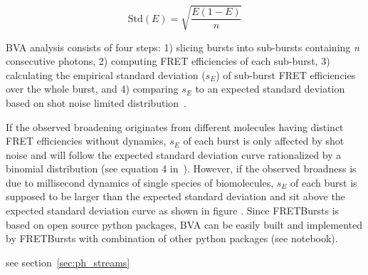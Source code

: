 \begin{equation}
\label{eq:binom_std}
\operatorname{Std(\textit{E})} = {\sqrt{\frac{E(1 - E)}{n}}}
\end{equation}

BVA analysis consists of four steps: 1) slicing bursts into sub-bursts containing \textit{n} consecutive photons, 2) computing FRET efficiencies of each sub-burst, 3) calculating the empirical standard deviation ($s_E$) of sub-burst FRET efficiencies over the whole burst, and 4) comparing $s_E$ to an expected standard deviation based on shot noise limited distribution~\cite{Torella_2011}. 

If the observed broadening originates from different molecules having distinct FRET efficiencies without dynamics, $s_E$ of each burst is only affected by shot noise and will follow the expected standard deviation curve rationalized by a binomial distribution (see equation 4 in~\cite{Torella_2011}). However, if the observed broadness is due to millisecond dynamics of single species of biomolecules, $s_E$ of each burst is supposed to be larger than the expected standard deviation and sit above the expected standard deviation curve as shown in figure .
Since FRETBursts is based on open source python packages, BVA can be easily built and implemented by FRETBursts with combination of other python packages (see notebook).  



see section~\ref{sec:ph_streams}
